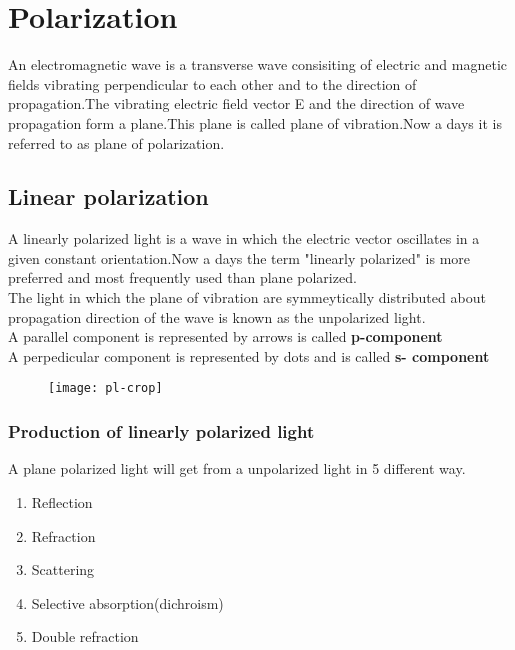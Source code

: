 \chapter{Polarization}

An electromagnetic wave is a transverse wave consisiting of electric and magnetic fields vibrating perpendicular to each other and to the direction of propagation.The vibrating electric field vector E and the direction of wave propagation form a plane.This plane is called plane of vibration.Now a days it is referred to as plane of polarization.
\section{Linear polarization}
 A linearly polarized light is a wave in which the electric vector oscillates in a given constant orientation.Now a days the term "linearly polarized" is more preferred and most frequently used than plane polarized.\\
 The light in which the plane of vibration are symmeytically distributed about propagation direction of the wave is known as the unpolarized light.\\
 A parallel component is represented by arrows is called \textbf{p-component}\\
 A perpedicular component is represented by dots and is called \textbf{s- component}\\
\begin{figure}[H]
	\centering
	\texttt{[image: pl-crop]}
	\caption{}
	\label{}
\end{figure}
 \subsection{Production of linearly polarized light}
A plane polarized light will get from a unpolarized light in 5 different way.
 \begin{enumerate}[label=\Roman*.]
	\item Reflection
	\item Refraction
	\item Scattering
	\item Selective absorption(dichroism)
	\item Double refraction
\end{enumerate}
